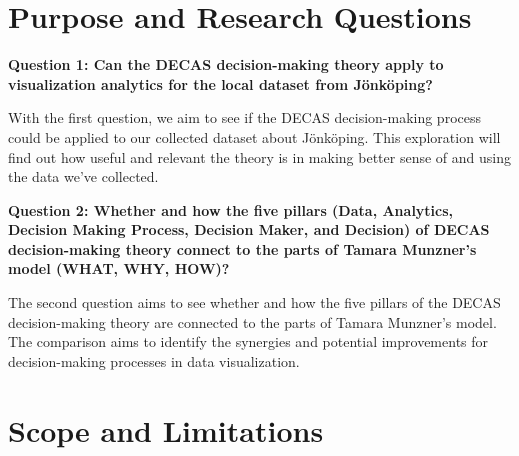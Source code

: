 \section{Purpose and Research Questions}
\textbf{Question 1: Can the DECAS decision-making theory apply to visualization analytics for the local dataset from Jönköping?}


With the first question, we aim to see if the DECAS decision-making process could be applied to our collected dataset about Jönköping. This exploration will find out how useful and relevant the theory is in making better sense of and using the data we've collected.


\textbf{Question 2: Whether and how the five pillars (Data, Analytics, Decision Making Process, Decision Maker, and Decision) of DECAS decision-making theory connect to the parts of Tamara Munzner's model (WHAT, WHY, HOW)?}


The second question aims to see whether and how the five pillars of the DECAS decision-making theory are connected to the parts of Tamara Munzner’s model. The comparison aims to identify the synergies and potential improvements for decision-making processes in data visualization.













\section{Scope and Limitations}

